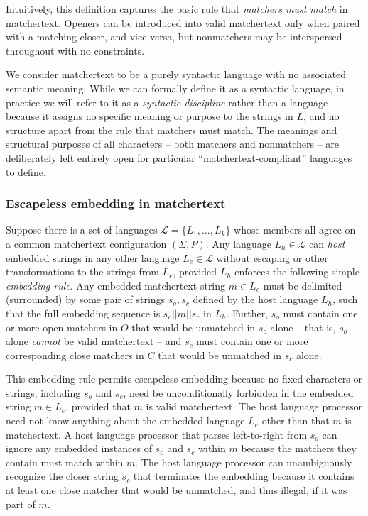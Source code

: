 Intuitively, this definition captures the basic rule
that \emph{matchers must match} in matchertext.
Openers can be introduced into valid matchertext
only when paired with a matching closer, and vice versa,
but nonmatchers may be interspersed throughout with no constraints.

We consider matchertext to be a purely syntactic language
with no associated semantic meaning.
While we can formally define it as a syntactic language,
in practice we will refer to it as a \emph{syntactic discipline}
rather than a language
because it assigns no specific meaning or purpose to the strings in $L$,
and no structure apart from the rule that matchers must match.
The meanings and structural purposes of all characters --
both matchers and nonmatchers --
are deliberately left entirely open
for particular ``matchertext-compliant'' languages to define.


\subsubsection{Escapeless embedding in matchertext}
\label{sec:design:abstract:embed}

Suppose there is a set of languages $\mathcal{L} = \{L_1,\dots,L_k\}$
whose members all agree on a common  matchertext configuration $(\Sigma,P)$.
Any language $L_h \in \mathcal{L}$ can \emph{host}
embedded strings in any other language $L_e \in \mathcal{L}$
without escaping or other transformations to the strings from $L_e$,
provided $L_h$ enforces the following simple \emph{embedding rule}.
Any embedded matchertext string $m \in L_e$ 
must be delimited (surrounded) by
some pair of strings $s_o, s_c$ defined by the host language $L_h$,
such that the full embedding sequence is $s_o || m || s_c$ in $L_h$.
Further, $s_o$ must contain one or more open matchers in $O$
that would be unmatched in $s_o$ alone --
that is, $s_o$ alone \emph{cannot} be valid matchertext --
and $s_c$ must contain one or more corresponding close matchers in $C$
that would be unmatched in $s_c$ alone.

This embedding rule permits escapeless embedding
because no fixed characters or strings, including $s_o$ and $s_c$,
need be unconditionally forbidden in the embedded string $m \in L_e$,
provided that $m$ is valid matchertext.
The host language processor need not know anything
about the embedded language $L_e$ other than that $m$ is matchertext.
A host language processor that parses left-to-right from $s_o$
can ignore any embedded instances of $s_o$ and $s_c$ within $m$
because the matchers they contain must match within $m$.
The host language processor can unambiguously recognize
the closer string $s_c$ that terminates the embedding
because it contains at least one close matcher
that would be unmatched, and thus illegal, if it was part of $m$.


